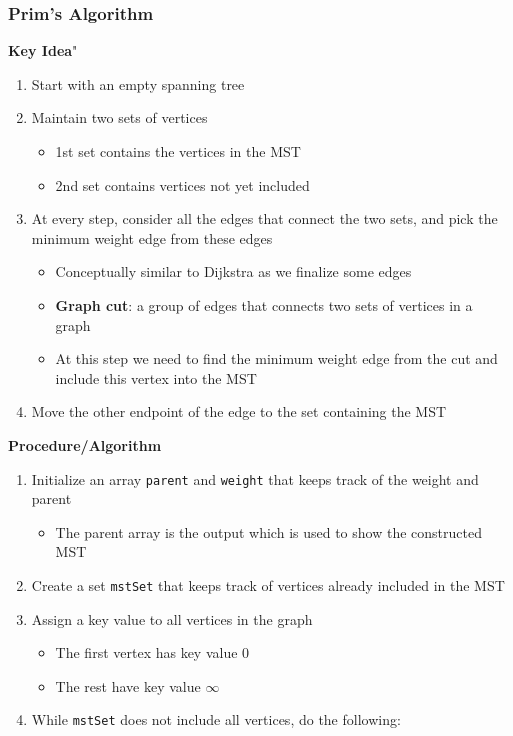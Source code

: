 \documentclass{article}
\begin{document}
\begin{multicols}{2}
\subsubsection{Prim's Algorithm}
\textbf{Key Idea}"
\begin{enumerate}
	\item Start with an empty spanning tree
	\item Maintain two sets of vertices
	\begin{itemize}
		\item 1st set contains the vertices in the MST
		\item 2nd set contains vertices not yet included
	\end{itemize}
    \item At every step, consider all the edges that connect the two sets, and pick the minimum weight edge from these edges
    \begin{itemize}
    	\item Conceptually similar to Dijkstra as we finalize some edges
    	\item \textbf{Graph cut}: a group of edges that connects two sets of vertices in a graph
    	\item At this step we need to find the minimum weight edge from the cut and include this vertex into the MST
    \end{itemize}
    \item Move the other endpoint of the edge to the set containing the MST
\end{enumerate}
\textbf{Procedure/Algorithm}
\begin{enumerate}
	\item Initialize an array \texttt{parent} and \texttt{weight} that keeps track of the weight and parent
	\begin{itemize}
		\item The parent array is the output which is used to show the constructed MST
	\end{itemize}
	\item Create a set \texttt{mstSet} that keeps track of vertices already included in the MST
	\item Assign a key value to all vertices in the graph
	\begin{itemize}
		\item The first vertex has key value 0
		\item The rest have key value $\infty$
	\end{itemize}
    \item While \texttt{mstSet} does not include all vertices, do the following:

\end{enumerate}
\end{multicols}
\end{document}
